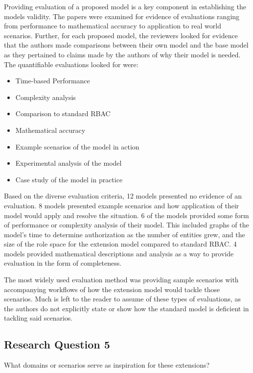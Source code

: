 Providing evaluation of a proposed model is a key component in establishing the models validity.  The papers were examined
for evidence of evaluations ranging from performance to mathematical accuracy to application to real world scenarios.  Further,
for each proposed model, the reviewers looked for evidence that the authors made comparisons between their own model and the base
model as they pertained to claims made by the authors of why their model is needed.  The quantifiable evaluations looked for were:

\begin{itemize}
\item Time-based Performance
\item Complexity analysis
\item Comparison to standard RBAC
\item Mathematical accuracy
\item Example scenarios of the model in action
\item Experimental analysis of the model
\item Case study of the model in practice
\end{itemize}

Based on the diverse evaluation criteria, 12 models presented no evidence of an evaluation.  8 models presented example scenarios
and how application of their model would apply and resolve the situation.  6 of the models provided some form of performance
or complexity analysis of their model.  This included graphs of the model's time to determine authorization as the number of entities
grew, and the size of the role space for the extension model compared to standard RBAC. 4 models provided mathematical descriptions
and analysis as a way to provide evaluation in the form of completeness.

The most widely used evaluation method was providing sample scenarios with accompanying workflows of how the extension model
would tackle those scenarios.  Much is left to the reader to assume of these types of evaluations, as the authors do not explicitly state
or show how the standard model is deficient in tackling said scenarios.

\subsection{Research Question 5}

What domains or scenarios serve as inspiration for these extensions? \\

